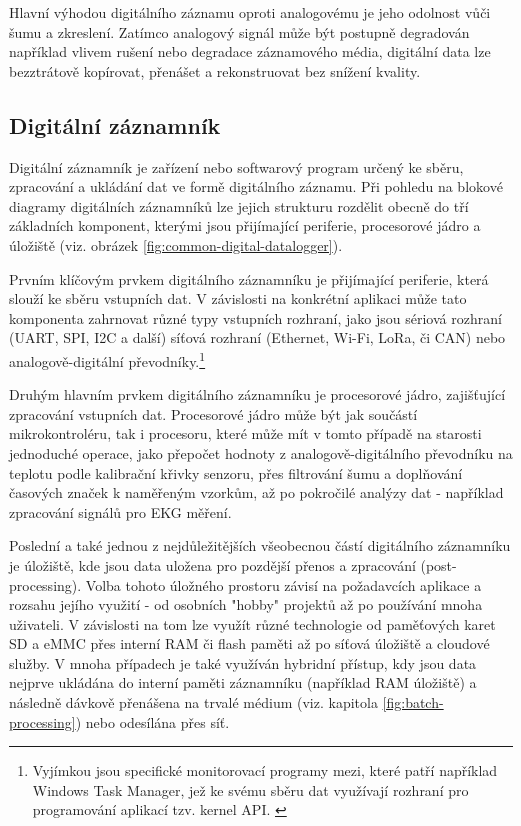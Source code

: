 Hlavní výhodou digitálního záznamu oproti analogovému je jeho odolnost vůči šumu a zkreslení. Zatímco analogový signál může být 
postupně degradován například vlivem rušení nebo degradace záznamového média, digitální data lze bezztrátově kopírovat, přenášet 
a rekonstruovat bez snížení kvality.

\subsection{Digitální záznamník}
\label{digitalni_zaznamik}
Digitální záznamník je zařízení nebo softwarový program určený ke sběru, zpracování a ukládání dat ve formě digitálního záznamu. 
Při pohledu na blokové diagramy digitálních záznamníků lze jejich strukturu rozdělit obecně do tří základních komponent, kterými 
jsou přijímající periferie, procesorové jádro a úložiště (viz. obrázek \ref{fig:common-digital-datalogger}). 
\cite{researchgate_general_dataloggger_multiple_sdcards, ieee_digital_sound_recorder_arm_sd_card, ieee_multi_connectivity_datalogger_sd_card}

Prvním klíčovým prvkem digitálního záznamníku je přijímající periferie, která slouží ke sběru vstupních dat. V závislosti na 
konkrétní aplikaci může tato komponenta zahrnovat různé typy vstupních rozhraní, jako jsou sériová rozhraní (UART, SPI, I2C a další) 
síťová rozhraní (Ethernet, Wi-Fi, LoRa, či CAN) nebo analogově-digitální převodníky.\footnote{Vyjímkou jsou specifické monitorovací programy 
mezi, které patří například Windows Task Manager, jež ke svému sběru dat využívají rozhraní pro programování aplikací tzv. kernel API. 
\cite{fourcore_win_process_birth}} \cite{ieee_digital_sound_recorder_arm_sd_card}

\newpage

Druhým hlavním prvkem digitálního záznamníku je procesorové jádro, zajišťující zpracování vstupních dat. Procesorové jádro může být 
jak součástí mikrokontroléru, tak i procesoru, které může mít v tomto případě na starosti jednoduché operace, jako přepočet hodnoty 
z analogově-digitálního převodníku na teplotu podle kalibrační křivky senzoru, přes filtrování šumu a doplňování časových značek 
k naměřeným vzorkům, až po pokročilé analýzy dat - například zpracování signálů pro EKG měření. 
\cite{springer_development_ECG_recorder}

Poslední a také jednou z nejdůležitějších všeobecnou částí digitálního záznamníku je úložiště, kde jsou data uložena pro pozdější 
přenos a zpracování (post-processing). Volba tohoto úložného prostoru závisí na požadavcích aplikace a rozsahu jejího využití - od 
osobních "hobby" projektů až po používání mnoha uživateli. V závislosti na tom lze využít různé technologie od paměťových karet SD 
a eMMC přes interní RAM či flash paměti až po síťová úložiště a cloudové služby. V mnoha případech je také využíván hybridní přístup, 
kdy jsou data nejprve ukládána do interní paměti záznamníku (například RAM úložiště) a následně dávkově přenášena na trvalé médium 
(viz. kapitola \ref{fig:batch-processing}) nebo odesílána přes síť. \cite{rta_local_vs_cloud}
    

